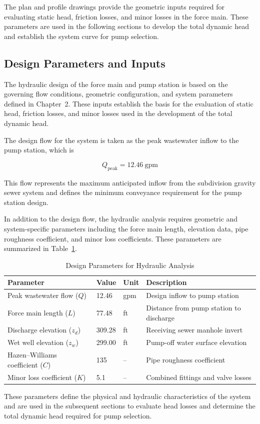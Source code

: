 The plan and profile drawings provide the geometric inputs required for evaluating static head, friction losses, and minor losses in the force main. These parameters are used in the following sections to develop the total dynamic head and establish the system curve for pump selection.


\subsection{Design Parameters and Inputs}

The hydraulic design of the force main and pump station is based on the governing flow conditions, geometric configuration, and system parameters defined in Chapter~2. These inputs establish the basis for the evaluation of static head, friction losses, and minor losses used in the development of the total dynamic head.

The design flow for the system is taken as the peak wastewater inflow to the pump station, which is

\[
Q_{\text{peak}} = 12.46~\text{gpm}
\]

This flow represents the maximum anticipated inflow from the subdivision gravity sewer system and defines the minimum conveyance requirement for the pump station design.

In addition to the design flow, the hydraulic analysis requires geometric and system-specific parameters including the force main length, elevation data, pipe roughness coefficient, and minor loss coefficients. These parameters are summarized in Table~\ref{tab:design_inputs_ch5}.

\begin{table}[H]
\centering
\caption{Design Parameters for Hydraulic Analysis}
\label{tab:design_inputs_ch5}
\begin{tabular}{llll}
\toprule
\textbf{Parameter} & \textbf{Value} & \textbf{Unit} & \textbf{Description} \\
\midrule
Peak wastewater flow ($Q$) & 12.46 & gpm & Design inflow to pump station \\
Force main length ($L$) & 77.48 & ft & Distance from pump station to discharge \\
Discharge elevation ($z_d$) & 309.28 & ft & Receiving sewer manhole invert \\
Wet well elevation ($z_w$) & 299.00 & ft & Pump-off water surface elevation \\
Hazen--Williams coefficient ($C$) & 135 & -- & Pipe roughness coefficient \\
Minor loss coefficient ($K$) & 5.1 & -- & Combined fittings and valve losses \\
\bottomrule
\end{tabular}
\end{table}

These parameters define the physical and hydraulic characteristics of the system and are used in the subsequent sections to evaluate head losses and determine the total dynamic head required for pump selection.
